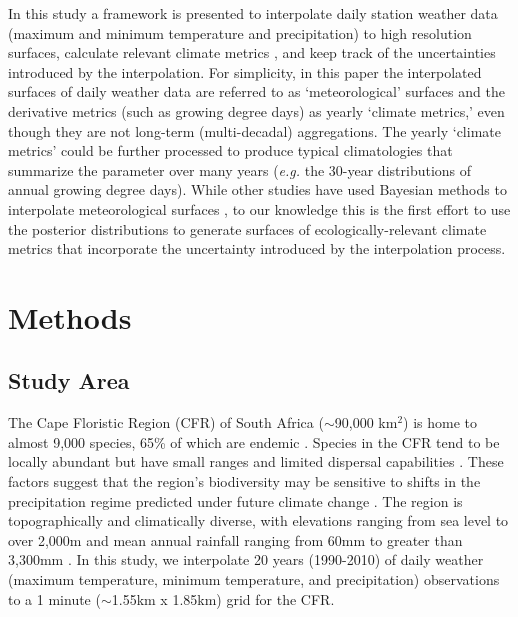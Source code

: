 \documentclass[12pt]{article}
\begin{document}
In this study a framework is presented to interpolate daily station
weather data (maximum and minimum temperature and precipitation) to
high resolution surfaces, calculate relevant climate metrics
\citep[see ][for a discussion of selecting relevant metrics for plants]{kimball_fitness_2012}, and keep track of the
uncertainties introduced by the interpolation.
For simplicity, in this paper the interpolated surfaces of
daily weather data are referred to as `meteorological' surfaces and the derivative
metrics (such as growing degree days) as yearly `climate metrics,' even
though they are not long-term (multi-decadal) aggregations.
The yearly `climate metrics' could be further processed to produce
typical climatologies that summarize the parameter over many years
(\textit{e.g.} the 30-year distributions of annual growing degree days).
While other studies have used Bayesian methods to interpolate
meteorological surfaces
\citep{sang_hierarchical_2009,cooley_bayesian_2007,riccio_bayesian_2005,newlands_validation_2011,johansson_high-resolution_2008,
alvarez-villa_improved_2011,fasbender_spatial_2010},  to our knowledge this is
the first effort to use the posterior distributions to generate
surfaces of ecologically-relevant climate metrics that incorporate the
uncertainty introduced by the interpolation process. 

\section{Methods}
\subsection{Study Area}
The Cape Floristic Region (CFR) of South
Africa ($\sim$90,000 km$^2$) is home to almost 9,000
species, 65\% of which are endemic \citep{goldblatt_floristic_1997}.
Species in the CFR tend to be locally abundant but have small
ranges and limited dispersal capabilities
\citep{latimer_neutral_2005}. 
These factors suggest that the region's biodiversity may be sensitive to
shifts in the precipitation regime predicted under future climate
change \citep[][section 11.2.3]{christensen_chapter_2007}.   
The region is topographically and climatically diverse, with
elevations ranging from sea level to over 2,000m and mean
annual rainfall ranging from 60mm to greater than 3,300mm
\citep{schulze_south_2007}.  
In this study, we interpolate 20 years (1990-2010) of daily weather (maximum
temperature, minimum temperature, and precipitation) observations to a
1 minute ($\sim$1.55km x 1.85km) grid for the CFR.  
\end{document}
